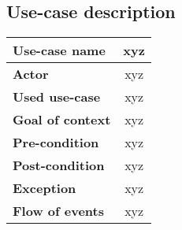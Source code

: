 \subsection{Use-case description}

\begin{tabular}{| l | c |}
	\hline \textbf{Use-case name} & xyz \\
	\hline \textbf{Actor} & xyz \\
	\hline \textbf{Used use-case} & xyz \\
	\hline \textbf{Goal of context} & xyz \\
	\hline \textbf{Pre-condition} & xyz \\
	\hline \textbf{Post-condition} & xyz \\
	\hline \textbf{Exception} & xyz \\
	\hline \textbf{Flow of events} & xyz \\
	\hline
\end{tabular}
